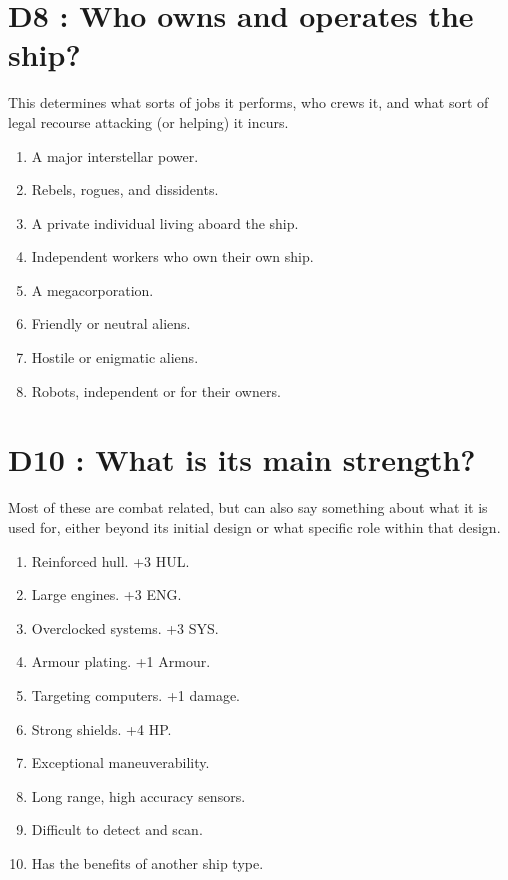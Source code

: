 \documentclass{article}
\begin{document}
\section*{D8 : Who owns and operates the ship?}
This determines what sorts of jobs it performs, who crews it, and what sort of legal recourse attacking (or helping) it incurs.
\begin{enumerate}
	\item A major interstellar power.
	\item Rebels, rogues, and dissidents.
	\item A private individual living aboard the ship.
	\item Independent workers who own their own ship.
	\item A megacorporation.
	\item Friendly or neutral aliens.
	\item Hostile or enigmatic aliens.
	\item Robots, independent or for their owners.
\end{enumerate}

\section*{D10 : What is its main strength?}
Most of these are combat related, but can also say something about what it is used for, either beyond its initial design or what specific role within that design.
\begin{enumerate}
	\item Reinforced hull. +3 HUL.
	\item Large engines. +3 ENG.
	\item Overclocked systems. +3 SYS.
	\item Armour plating. +1 Armour.
	\item Targeting computers. +1 damage.
	\item Strong shields. +4 HP.
	\item Exceptional maneuverability.
	\item Long range, high accuracy sensors.
	\item Difficult to detect and scan.
	\item Has the benefits of another ship type.
\end{enumerate}
\end{document}
